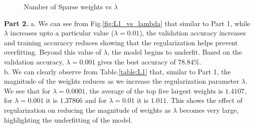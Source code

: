 \documentclass{article}
\begin{document}
\begin{figure}[!h]
    \centering
\caption{Number of Sparse weights vs $\lambda$}
    \label{fig:L2_sparsity}
\end{figure}



\textbf{Part 2.} a. We can see from Fig.\ref{fig:L1_vs_lambda} that similar to Part 1, while $\lambda$ increases upto a particular value ($\lambda=0.01$), the validation accuracy increases and training accuraccy reduces showing that the regularization helps prevent overfitting. Beyond this value of $\lambda$, the model begins to underfit. Based on the validation accuracy, $\lambda=0.001$ gives the best accuracy of $78.84\%$. \\

b. We can clearly observe from Table.\ref{table:L1} that, similar to Part 1, the magnitude of the weights reduces as we increase the regularization parameter $\lambda$. We see that for $\lambda=0.0001$, the average of the top five largest weights is $1.4107$, for $\lambda=0.001$ it is $1.37866$ and for $\lambda=0.01$ it is $1.011$. This shows the effect of regularization on reducing the magnitude of weights as $\lambda$ becomes very large, highlighting the underfitting of the model.\\
\end{document}

